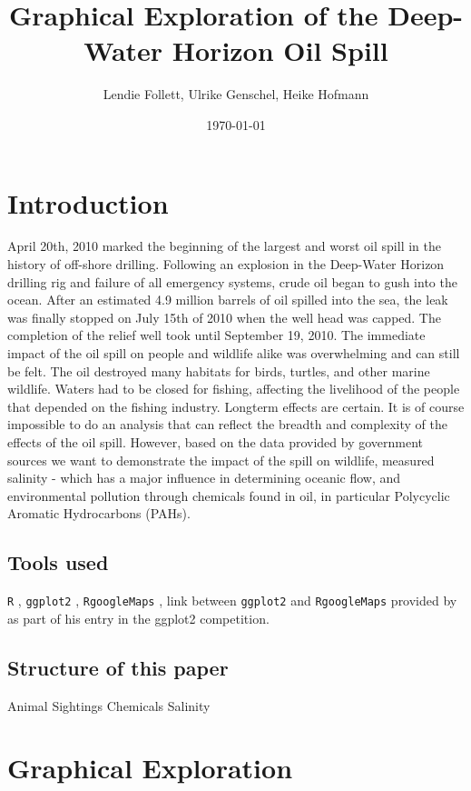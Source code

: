 \documentclass[authoryear,12pt]{elsarticle}
\title{Graphical Exploration of the Deep-Water Horizon Oil Spill}
\author{Lendie Follett, Ulrike Genschel, Heike Hofmann}
\date{\today}                                           %
\begin{document}
\maketitle
\begin{abstract}
\end{abstract}
\section{Introduction}
April 20th, 2010 marked the beginning of the largest and worst oil spill in the history of off-shore drilling.  Following an explosion in the Deep-Water Horizon drilling rig and failure of all emergency systems, crude oil began to gush into the ocean.  After an estimated 4.9 million barrels of oil spilled into the sea, the leak was finally stopped on July 15th of 2010 when the well head was capped.  The completion of the relief well took until September 19, 2010.  The immediate impact of the oil spill on people and wildlife alike was overwhelming and can still be felt.  The oil destroyed many habitats for birds, turtles, and other marine wildlife.  Waters had to be closed for fishing, affecting the livelihood of the people that depended on the fishing industry. Longterm effects are certain. It is of course impossible to do an analysis that can reflect the breadth and complexity of the effects of the oil spill.  However, based on the data provided by government sources we want to demonstrate the impact of the spill on wildlife, measured salinity - which has a major influence in determining oceanic flow, and environmental pollution through chemicals found in oil, in particular Polycyclic Aromatic Hydrocarbons (PAHs). 
\subsection{Tools used}


{\tt R} \citep{R2011}, {\tt ggplot2} \citep{ggplot2}, {\tt RgoogleMaps} \citep{RgoogleMaps}, link between {\tt ggplot2} and {\tt RgoogleMaps} provided by \citet{kahle2010} as part of his entry in the ggplot2 competition.

\subsection{Structure of this paper}
Animal Sightings \newline
Chemicals \newline
Salinity

\section{Graphical Exploration}
\end{document}
